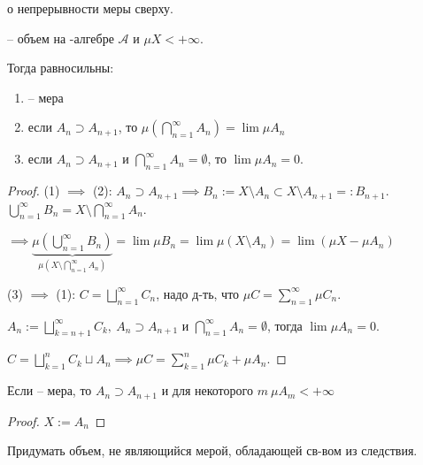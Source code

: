 \begin{theorem}
    о непрерывности меры сверху.

    \mu -- объем на \sigma-алгебре $\mathcal{A}$ и $\mu X < +\infty$.

    Тогда равносильны: 
    \begin{enumerate}
        \item \mu -- мера
        \item если $A_n \supset A_{n+1}$, то $\mu \left(\bigcap_{n=1}^{\infty} A_n\right) = \lim \mu A_n$
        \item если $A_n \supset A_{n+1}$ и $\bigcap_{n=1}^{\infty} A_n = \emptyset$, то $\lim \mu A_n = 0$.
    \end{enumerate}
\end{theorem}

\begin{proof}
    (1) $\implies $ (2): $A_n \supset A_{n+1} \implies B_n := X \setminus A_n \subset X \setminus A_{n+1} =: B_{n+1}$. $\bigcup_{n=1}^{\infty} B_n = X \setminus \bigcap_{n=1}^{\infty} A_n$.

    $\implies \underbrace{\mu \left( \bigcup_{n=1}^{\infty} B_n \right)}_{\mu (X \setminus \bigcap_{n=1}^{\infty} A_n)} = \lim \mu B_n = \lim \mu (X \setminus A_n) = \lim (\mu X - \mu A_n)$


    (3) $\implies $ (1): $C = \bigsqcup_{n=1}^{\infty} C_n$, надо д-ть, что $\mu C = \sum_{n=1}^{\infty} \mu C_n$.

    $A_n := \bigsqcup_{k=n + 1}^{\infty} C_k, \ A_n \supset A_{n+1}$ и $\bigcap_{n=1}^{\infty} A_n = \emptyset$, тогда $\lim \mu A_n = 0$.

    $C = \bigsqcup_{k=1}^{n} C_k \sqcup A_n \implies \mu C  = \sum_{k=1}^{n} \mu C_k + \mu A_n$.
\end{proof}

\begin{consequence}
    Если \mu-- мера, то $A_n \supset A_{n+1}$ и  для некоторого $m \ \mu A_m < +\infty$
\end{consequence}
\begin{proof}
    $X := A_n$
\end{proof}
\begin{exerc}
    Придумать объем, не являющийся мерой, обладающей св-вом из следствия. 
\end{exerc}

